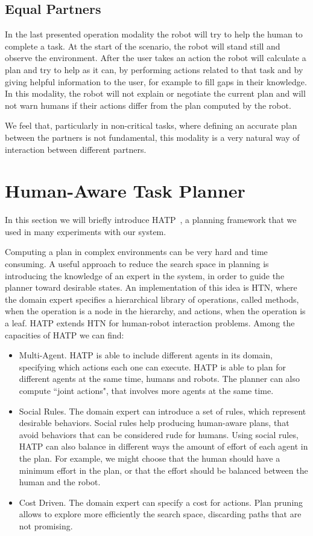\subsection{Equal Partners}
In the last presented operation modality the robot will try to help
the human to complete a task. At the start of the scenario, the robot
will stand still and observe the environment. After the user takes an
action the robot will calculate a plan and try to help as it can, by
performing actions related to that task and by giving helpful information to
the user, for example to fill gaps in their knowledge. In this modality, 
the robot will not explain or negotiate the current plan and will not warn humans if
their actions differ from the plan computed by the robot.

We feel that, particularly in non-critical tasks, where defining an accurate plan between the partners is not
fundamental, this modality is a very natural way of
interaction between different partners.



\section{Human-Aware Task Planner}
\label{sec:plan_management-hatp}
In this section we will briefly introduce HATP~\citep{Lallement2014}, a planning framework that we used in many experiments with our system.

Computing a plan in complex environments can be very hard and time consuming. A useful approach to reduce the search space in planning is introducing the knowledge of an expert in the system, in order to guide the planner toward desirable states. An implementation of this idea is HTN, where the domain expert specifies a hierarchical library of operations, called methods, when the operation is a node in the hierarchy, and actions, when the operation is a leaf. HATP extends HTN for human-robot interaction problems. Among the capacities of HATP we can find:
\begin{itemize}
\item Multi-Agent. HATP is able to include different agents in its domain, specifying which actions each one can execute. HATP is able to plan for different agents at the same time, humans and robots. The planner can also compute ``joint actions", that involves more agents at the same time.
\item Social Rules. The domain expert can introduce a set of rules, which represent desirable behaviors. Social rules help producing human-aware plans, that avoid behaviors that can be considered rude for humans. Using social rules, HATP can also balance in different ways the amount of effort of each agent in the plan. For example, we might choose that the human should have a minimum effort in the plan, or that the effort should be balanced between the human and the robot.
\item Cost Driven. The domain expert can specify a cost for actions. Plan pruning allows to explore more efficiently the search space, discarding paths that are not promising.
\end{itemize} 

